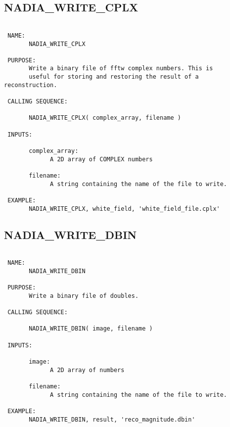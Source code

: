   
 
\subsection{NADIA\_WRITE\_CPLX}
\begin{verbatim}

 NAME:
       NADIA_WRITE_CPLX

 PURPOSE:
       Write a binary file of fftw complex numbers. This is
       useful for storing and restoring the result of a reconstruction.

 CALLING SEQUENCE:

       NADIA_WRITE_CPLX( complex_array, filename )

 INPUTS:

       complex_array:
             A 2D array of COMPLEX numbers

       filename:
             A string containing the name of the file to write.

 EXAMPLE:
       NADIA_WRITE_CPLX, white_field, 'white_field_file.cplx'

\end{verbatim}

  
 
\subsection{NADIA\_WRITE\_DBIN}
\begin{verbatim}

 NAME:
       NADIA_WRITE_DBIN

 PURPOSE:
       Write a binary file of doubles. 

 CALLING SEQUENCE:

       NADIA_WRITE_DBIN( image, filename )

 INPUTS:

       image:
             A 2D array of numbers

       filename:
             A string containing the name of the file to write.

 EXAMPLE:
       NADIA_WRITE_DBIN, result, 'reco_magnitude.dbin'

\end{verbatim}

